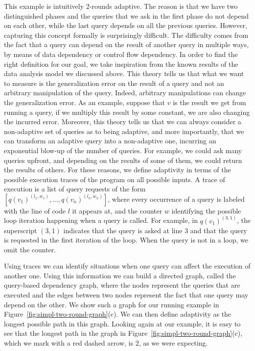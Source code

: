 This example is intuitively 2-rounds adaptive. The reason is that we have two distinguished phases and the queries that we ask in the first phase do not depend on each other, while the last query depends on all the previous queries. 
However, capturing this concept formally is surprisingly difficult. The difficulty comes from the fact that a query can depend on the result of another query in multiple ways, by means of data dependency or control flow dependency. In order to find the right definition for our goal, we take inspiration from the known results of the data analysis model we discussed above. This theory tells us that what we want to measure is the generalization error on the result of a query and not an arbitrary manipulation of the query. Indeed, arbitrary manipulations can change the generalization error. As an example, suppose that $v$ is the result we get from running a query, if we multiply this result by some constant, we are also changing the incurred error. Moreover, this theory tells us that we can always consider a non-adaptive set of queries as to being adaptive, and more importantly, that we can transform an adaptive query into a non-adaptive one, incurring an exponential blow-up of the number of queries. For example, we could ask many queries upfront, and depending on the results of some of them, we could return the results of others. For these reasons, we define adaptivity in terms of the possible execution traces of the program on all possible inputs. A trace of execution is a list of query requests of the form $[q(v_1)^{(l_1,w_1)},\ldots, q(v_n)^{(l_n,w_n)}]$, where every occurrence of a query is labeled with the line of code $l$ it appears at, and the counter $w$ identifying the possible loop iteration happening when a query is called. For example, in $q(v_1)^{(3,1)}$, the superscript $(3,1)$ indicates that the query is asked at line $3$ and that the query is requested in the first iteration of the loop. When the query is not in a loop, we omit the counter.

Using traces we can identify situations when one query can affect the execution of another one. Using this information we can build a directed graph, called the query-based dependency graph, where the nodes represent the queries that are executed and the edges between two nodes represent the fact that one query may depend on the other. We show such a graph for our running example in Figure~\ref{fig:simpl-two-round-graph}(c). We can then define adaptivity as the longest possible path in this graph.  Looking again at our example, it is easy to see that the longest path in the graph in Figure~\ref{fig:simpl-two-round-graph}(c), which we mark with a red dashed arrow, is $2$, as we were expecting.


